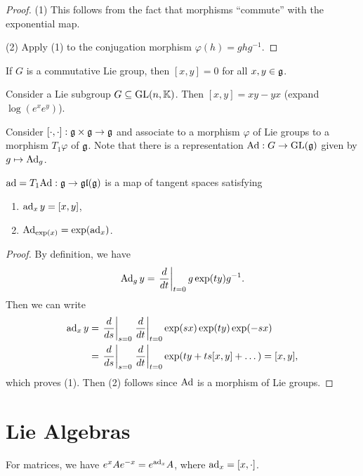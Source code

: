\begin{proof}
  (1) This follows from the fact that
  morphisms ``commute'' with the
  exponential map.

  (2) Apply (1) to the conjugation
  morphism $\varphi(h) = g h g^{-1}$.
\end{proof}

\begin{corollary}
  If $G$ is a commutative Lie group,
  then $[x, y] = 0$ for all $x, y \in \mathfrak{g}$.
\end{corollary}

\begin{example}
  Consider a Lie subgroup
  $G \subseteq \operatorname{GL}(n, \mathbb{K})$.
  Then $[x, y] = xy - yx$
  (expand $\log(e^x e^y)$).
\end{example}

\begin{remark}
  Consider $[\cdot, \cdot] : \mathfrak{g} \times \mathfrak{g} \to \mathfrak{g}$
  and associate to
  a morphism $\varphi$ of Lie groups
  to a morphism $T_1 \varphi$
  of $\mathfrak{g}$. Note that there is a
  representation
  $\operatorname{Ad} : G \to \operatorname{GL}(\mathfrak{g})$ given by
  $g \mapsto \operatorname{Ad}_g$.
\end{remark}

\begin{lemma}
  $\operatorname{ad} = T_1{\operatorname{Ad}} : \mathfrak{g} \to \mathfrak{gl}(\mathfrak{g})$
  is a map of tangent spaces
  satisfying
  \begin{enumerate}
    \item $\operatorname{ad}_x y = [x, y]$,
    \item $\operatorname{Ad}_{\exp(x)} = \exp(\operatorname{ad}_x)$.
  \end{enumerate}
\end{lemma}

\begin{proof}
  By definition, we have
  \[
    \operatorname{Ad}_g y
    = \left.\frac{d}{dt}\right|_{t = 0}
      g \exp(ty) g^{-1}.
  \]
  Then we can write
  \begin{align*}
    \operatorname{ad}_x y
    &= \left.\frac{d}{ds}\right|_{s = 0}
      \left.\frac{d}{dt}\right|_{t = 0}
        \exp(sx) \exp(ty) \exp(-sx) \\
    &= \left.\frac{d}{ds}\right|_{s = 0}
    \left.\frac{d}{dt}\right|_{t = 0}
      \exp(ty + ts[x, y] + \dots)
    = [x, y],
  \end{align*}
  which proves (1). Then
  (2) follows since
  $\operatorname{Ad}$ is a morphism of Lie groups.
\end{proof}

\section{Lie Algebras}
\begin{example}
  For matrices, we have
  $e^x A e^{-x} = e^{\operatorname{ad}_x} A$,
  where $\operatorname{ad}_x = [x, \cdot]$.
\end{example}


